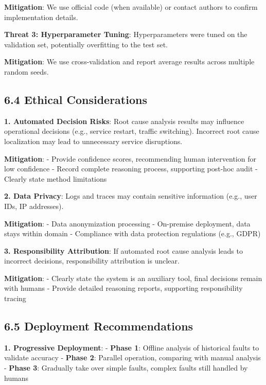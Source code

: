 \textbf{Mitigation}: We use official code (when available) or contact
authors to confirm implementation details.

\textbf{Threat 3: Hyperparameter Tuning}: Hyperparameters were tuned on
the validation set, potentially overfitting to the test set.

\textbf{Mitigation}: We use cross-validation and report average results
across multiple random seeds.

\hypertarget{ethical-considerations}{%
\subsection{6.4 Ethical Considerations}\label{ethical-considerations}}

\textbf{1. Automated Decision Risks}: Root cause analysis results may
influence operational decisions (e.g., service restart, traffic
switching). Incorrect root cause localization may lead to unnecessary
service disruptions.

\textbf{Mitigation}: - Provide confidence scores, recommending human
intervention for low confidence - Record complete reasoning process,
supporting post-hoc audit - Clearly state method limitations

\textbf{2. Data Privacy}: Logs and traces may contain sensitive
information (e.g., user IDs, IP addresses).

\textbf{Mitigation}: - Data anonymization processing - On-premise
deployment, data stays within domain - Compliance with data protection
regulations (e.g., GDPR)

\textbf{3. Responsibility Attribution}: If automated root cause analysis
leads to incorrect decisions, responsibility attribution is unclear.

\textbf{Mitigation}: - Clearly state the system is an auxiliary tool,
final decisions remain with humans - Provide detailed reasoning reports,
supporting responsibility tracing

\hypertarget{deployment-recommendations}{%
\subsection{6.5 Deployment
Recommendations}\label{deployment-recommendations}}

\textbf{1. Progressive Deployment}: - \textbf{Phase 1}: Offline analysis
of historical faults to validate accuracy - \textbf{Phase 2}: Parallel
operation, comparing with manual analysis - \textbf{Phase 3}: Gradually
take over simple faults, complex faults still handled by humans

